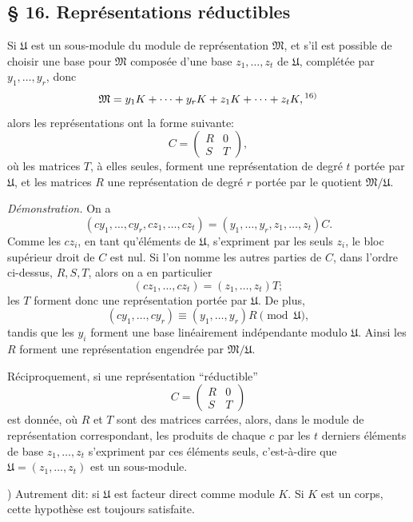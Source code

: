 
\providecommand{\mo}{\mathfrak{o}}
\providecommand{\mM}{\mathfrak{M}}
\providecommand{\mU}{\mathfrak{U}}
\providecommand{\mA}{\mathfrak{A}}
\providecommand{\mB}{\mathfrak{B}}

\subsection*{\S{} 16. Représentations réductibles}
Si $\mU$ est un sous-module du module de représentation $\mM$, et s'il est possible de choisir une base pour $\mM$ composée d'une base $z_1,\ldots,z_t$ de $\mU$, complétée par $y_1,\ldots,y_r$, donc
\[
        \mM=y_1K+\cdots+y_rK+z_1K+\cdots+z_tK,\textsuperscript{16)}
\]
alors les représentations ont la forme suivante:
\[
        C=\begin{pmatrix}R&0\\ S&T\end{pmatrix},
\]
où les matrices $T$, à elles seules, forment une représentation de degré $t$ portée par $\mU$, et les matrices $R$ une représentation de degré $r$ portée par le quotient $\mM/\mU$.

\emph{Démonstration.} On a
\[
        (cy_1,\ldots,cy_r,cz_1,\ldots,cz_t)
        =(y_1,\ldots,y_r,z_1,\ldots,z_t)C.
\]
Comme les $cz_i$, en tant qu'éléments de $\mU$, s'expriment par les seuls $z_i$, le bloc supérieur droit de $C$ est nul. Si l'on nomme les autres parties de $C$, dans l'ordre ci-dessus, $R,S,T$, alors on a en particulier
\[
        (cz_1,\ldots,cz_t)=(z_1,\ldots,z_t)T;
\]
les $T$ forment donc une représentation portée par $\mU$. De plus,
\[
        (cy_1,\ldots,cy_r)\equiv (y_1,\ldots,y_r)R\pmod{\mU},
\]
tandis que les $y_i$ forment une base linéairement indépendante modulo $\mU$. Ainsi les $R$ forment une représentation engendrée par $\mM/\mU$.

Réciproquement, si une représentation ``réductible''
\[
        C=\begin{pmatrix}R&0\\ S&T\end{pmatrix}
\]
est donnée, où $R$ et $T$ sont des matrices carrées, alors, dans le module de représentation correspondant, les produits de chaque $c$ par les $t$ derniers éléments de base $z_1,\ldots,z_t$ s'expriment par ces éléments seuls, c'est-à-dire que $\mU=(z_1,\ldots,z_t)$ est un sous-module.

{\footnotesize{}) Autrement dit: si $\mU$ est facteur direct comme module $K$. Si $K$ est un corps, cette hypothèse est toujours satisfaite.\par}

